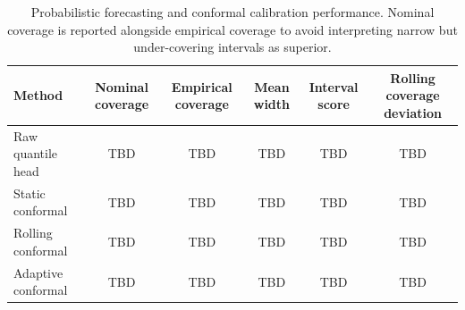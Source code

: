 \begin{table}[t]
\centering
\caption{Probabilistic forecasting and conformal calibration performance. Nominal coverage is reported alongside empirical coverage to avoid interpreting narrow but under-covering intervals as superior.}
\label{tab:probabilistic}
\begin{tabular}{lccccc}
\hline
Method & Nominal coverage & Empirical coverage & Mean width & Interval score & Rolling coverage deviation \\
\hline
Raw quantile head & TBD & TBD & TBD & TBD & TBD \\
Static conformal & TBD & TBD & TBD & TBD & TBD \\
Rolling conformal & TBD & TBD & TBD & TBD & TBD \\
Adaptive conformal & TBD & TBD & TBD & TBD & TBD \\
\hline
\end{tabular}
\end{table}
